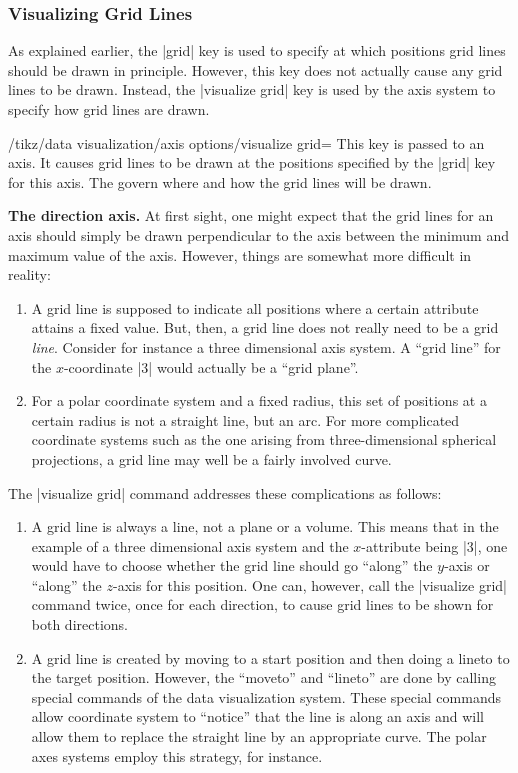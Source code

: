 \subsubsection{Visualizing Grid Lines}
\label{section-dv-visualize-gridlines}

As explained earlier, the |grid| key is used to specify at which positions grid lines should be drawn in principle. However, this key does not actually cause any grid lines to be drawn. Instead, the |visualize grid| key is used by the axis system to specify how grid lines are drawn.

\begin{key}{/tikz/data visualization/axis options/visualize grid=}
    This key is passed to an axis. It causes grid lines to be drawn at the positions specified by the |grid| key for this axis. The  govern where and how the grid lines will be drawn.


    \medskip
    \textbf{The direction axis.}
    At first sight, one might expect that the grid lines for an axis should simply be drawn perpendicular to the axis between the minimum and maximum value of the axis. However, things are somewhat more difficult in reality:
    \begin{enumerate}
        \item A grid line is supposed to indicate all positions where a certain attribute attains a fixed value. But, then, a grid line does not really need to be a grid \emph{line}. Consider for instance a three dimensional axis system. A ``grid line'' for the $x$-coordinate |3| would actually be a ``grid plane''.
        \item For a polar coordinate  system and a fixed radius, this set of positions at a certain radius is not a straight line, but an arc. For more complicated coordinate systems such as the one arising from three-dimensional spherical projections, a grid line may well be a fairly involved curve.
    \end{enumerate}
    The |visualize grid| command addresses these complications as follows:
    \begin{enumerate}
        \item A grid line is always a line, not a plane or a volume. This means that in the example of a three dimensional axis system and the $x$-attribute being |3|, one would have to choose whether the grid line should go ``along'' the $y$-axis or ``along'' the $z$-axis for this position. One can, however, call the |visualize grid| command twice, once for each direction, to cause grid lines to be shown for both directions.
        \item A grid line is created by moving to a start position and then doing a lineto to the target position. However, the ``moveto'' and ``lineto'' are done by calling special commands of the data visualization system. These special commands allow coordinate system to ``notice'' that the line is along an axis and will allow them to replace the straight line by an appropriate curve. The polar axes systems employ this strategy, for instance.
    \end{enumerate}


\end{key}

